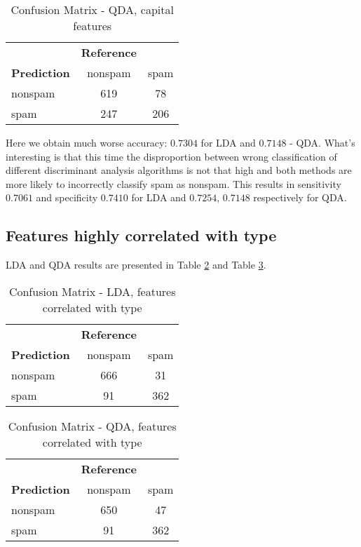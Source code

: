 \documentclass[12pt, letter paper]{article}
\begin{document}
	\begin{table}[h]
		\centering
		\begin{tabular}{lcc}
			& \textbf{Reference} & \\
			\textbf{Prediction} & nonspam & spam \\
			nonspam & 619 & 78 \\
			spam & 247 & 206 \\
		\end{tabular}
		\caption{Confusion Matrix - QDA, capital features}
		\label{tab:confusion_matrix_qda3}
	\end{table}
	 
	 Here we obtain much worse accuracy: $0.7304$ for LDA and $0.7148$ - QDA. What's interesting is that this time the disproportion between wrong classification of different discriminant analysis algorithms is not that high and both methods are more likely to incorrectly classify spam as nonspam. This results in sensitivity $0.7061$ and specificity $0.7410$ for LDA and $0.7254$, $0.7148$ respectively for QDA.
	 
	 \subsection*{Features highly correlated with type}
	 
	 LDA and QDA results are presented in Table \ref{tab:confusion_matrix_lda4} and Table \ref{tab:confusion_matrix_qda4}.
	 
	\begin{table}[h]
		\centering
		\begin{tabular}{lcc}
			& \textbf{Reference} & \\
			\textbf{Prediction} & nonspam & spam \\
			nonspam & 666 & 31 \\
			spam & 91 & 362 \\
		\end{tabular}
		\caption{Confusion Matrix - LDA, features correlated with type}
		\label{tab:confusion_matrix_lda4}
	\end{table}
	
	\begin{table}[h]
		\centering
		\begin{tabular}{lcc}
			& \textbf{Reference} & \\
			\textbf{Prediction} & nonspam & spam \\
			nonspam & 650 & 47 \\
			spam & 91 & 362 \\
		\end{tabular}
		\caption{Confusion Matrix - QDA, features correlated with type}
		\label{tab:confusion_matrix_qda4}
	\end{table}
	
\end{document}
